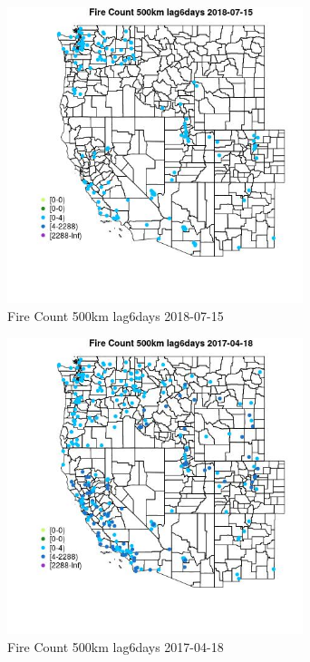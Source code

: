 \begin{figure} 
\centering  
\includegraphics[width=0.77\textwidth]{Code_Outputs/Report_ML_input_PM25_Step4_part_e_de_duplicated_aves_compiled_2019-05-20wNAs_MapObsFire_Count_500km_lag6days2018-07-15.jpg} 
\caption{\label{fig:Report_ML_input_PM25_Step4_part_e_de_duplicated_aves_compiled_2019-05-20wNAsMapObsFire_Count_500km_lag6days2018-07-15}Fire Count 500km lag6days 2018-07-15} 
\end{figure} 
 

\begin{figure} 
\centering  
\includegraphics[width=0.77\textwidth]{Code_Outputs/Report_ML_input_PM25_Step4_part_e_de_duplicated_aves_compiled_2019-05-20wNAs_MapObsFire_Count_500km_lag6days2017-04-18.jpg} 
\caption{\label{fig:Report_ML_input_PM25_Step4_part_e_de_duplicated_aves_compiled_2019-05-20wNAsMapObsFire_Count_500km_lag6days2017-04-18}Fire Count 500km lag6days 2017-04-18} 
\end{figure} 
 

